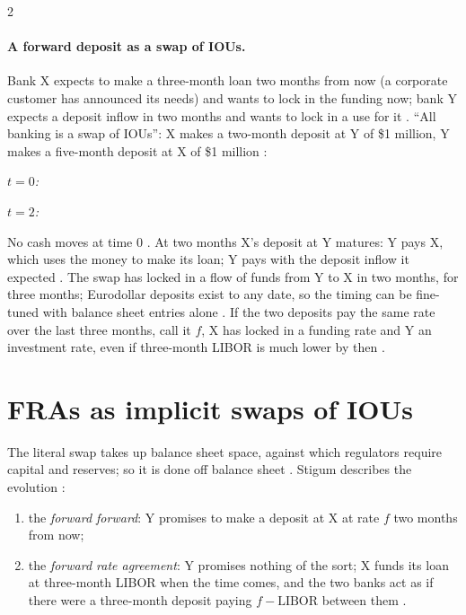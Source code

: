 \begin{paracol}{2}
\paragraph{A forward deposit as a swap of IOUs.} Bank X expects to make a three-month loan two months from now (a corporate customer has announced its needs) and wants to lock in
the funding now; bank Y expects a deposit inflow in two months and wants to lock in a use for it . ``All banking is a swap
of IOUs'': X makes a two-month deposit at Y of \$1 million, Y makes a five-month deposit at X of \$1 million :
\begin{taccts}
\textit{$t=0$:}\quad{}\quad
{}

\medskip
\textit{$t=2$:}\quad{}\quad
{}
\end{taccts}
No cash moves at time 0 . At two months X's deposit at Y matures: Y pays X, which uses the money to make its loan; Y pays with the deposit inflow it
expected . The swap has locked in a flow of funds from Y to X in two months, for three months; Eurodollar deposits exist to
any date, so the timing can be fine-tuned with balance sheet entries alone . If the two deposits pay the same rate over the last three months, call it
$f$, X has locked in a funding rate and Y an investment rate, even if three-month LIBOR is much lower by then .

\section{FRAs as implicit swaps of IOUs}\label{sec:ed-fra}

The literal swap takes up balance sheet space, against which regulators require capital and reserves; so it is done off balance sheet . Stigum describes the
evolution :
\begin{enumerate}
  \item the \emph{forward forward}: Y promises to make a deposit at X at rate $f$ two months from now;
  \item the \emph{forward rate agreement}: Y promises nothing of the sort; X funds its loan at three-month LIBOR when the time comes, and the two banks act as if there were a
        three-month deposit paying $f-\text{LIBOR}$ between them .
\end{enumerate}


\end{paracol}
